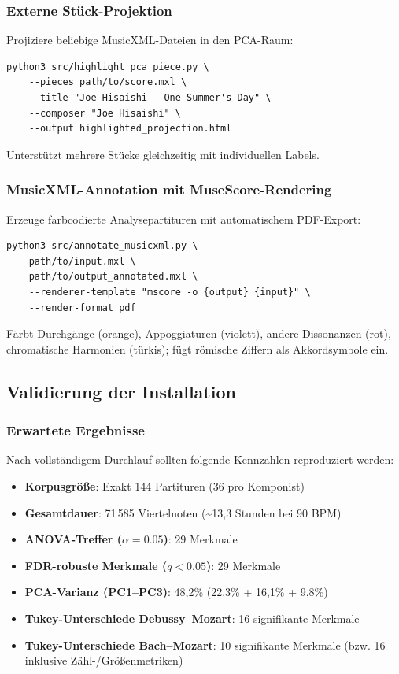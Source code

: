 \documentclass[10pt,a4paper]{article}
\theoremstyle{definition}
\begin{document}
\subsubsection{Externe Stück-Projektion}

Projiziere beliebige MusicXML-Dateien in den PCA-Raum:
\begin{lstlisting}
python3 src/highlight_pca_piece.py \
    --pieces path/to/score.mxl \
    --title "Joe Hisaishi - One Summer's Day" \
    --composer "Joe Hisaishi" \
    --output highlighted_projection.html
\end{lstlisting}
Unterstützt mehrere Stücke gleichzeitig mit individuellen Labels.

\subsubsection{MusicXML-Annotation mit MuseScore-Rendering}

Erzeuge farbcodierte Analysepartituren mit automatischem PDF-Export:
\begin{lstlisting}
python3 src/annotate_musicxml.py \
    path/to/input.mxl \
    path/to/output_annotated.mxl \
    --renderer-template "mscore -o {output} {input}" \
    --render-format pdf
\end{lstlisting}
Färbt Durchgänge (orange), Appoggiaturen (violett), andere Dissonanzen (rot), chromatische Harmonien (türkis); fügt römische Ziffern als Akkordsymbole ein.

\subsection{Validierung der Installation}

\subsubsection{Erwartete Ergebnisse}

Nach vollständigem Durchlauf sollten folgende Kennzahlen reproduziert werden:
\begin{itemize}
    \item \textbf{Korpusgröße}: Exakt 144 Partituren (36 pro Komponist)
    \item \textbf{Gesamtdauer}: 71\,585 Viertelnoten (\textasciitilde13,3 Stunden bei 90 BPM)
    \item \textbf{ANOVA-Treffer ($\alpha=0.05$)}: 29 Merkmale
    \item \textbf{FDR-robuste Merkmale ($q<0.05$)}: 29 Merkmale
    \item \textbf{PCA-Varianz (PC1--PC3)}: 48,2\% (22,3\% + 16,1\% + 9,8\%)
    \item \textbf{Tukey-Unterschiede Debussy--Mozart}: 16 signifikante Merkmale
    \item \textbf{Tukey-Unterschiede Bach--Mozart}: 10 signifikante Merkmale (bzw. 16 inklusive Zähl-/Größenmetriken)
\end{itemize}
\end{document}
